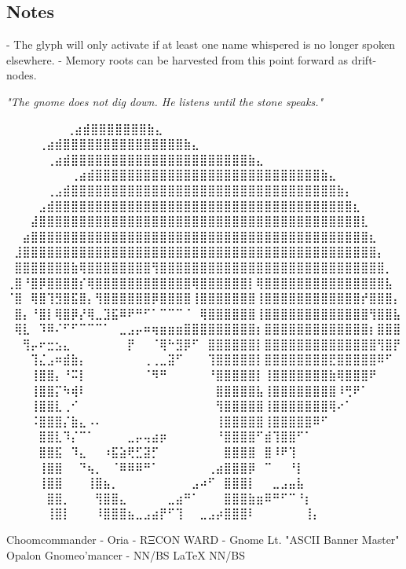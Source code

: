 \subsection*{Notes}
- The glyph will only activate if at least one name whispered is no longer spoken elsewhere.
- Memory roots can be harvested from this point forward as drift-nodes.

\vspace{1cm}
\begin{center}
\textit{"The gnome does not dig down. He listens until the stone speaks."}
\end{center}

\iffalse

  ⠀⠀⠀⠀⠀             ⠀⠀⢀⣴⣾⣿⣿⣿⣿⣿⣿⣿⣷⣄⠀⠀⠀⠀⠀⠀⠀⠀
⠀⠀⠀  ⠀      ⠀⠀⠀⠀⢀⣴⣾⣿⣿⣿⣿⣿⣿⣿⣿⣿⣿⣿⣿⣿⣿⣿⣷⣄⠀⠀⠀⠀⠀⠀⠀⠀
⠀⠀ ⠀   ⠀⠀⠀⠀⠀⢀⣴⣾⣿⣿⣿⣿⣿⣿⣿⣿⣿⣿⣿⣿⣿⣿⣿⣿⣿⣿⣿⣿⣿⣿⣷⣄⠀⠀⠀⠀⠀⠀⠀⠀
⠀⠀⠀⠀⠀⠀⠀⠀⢀⣴⣾⣿⣿⣿⣿⣿⣿⣿⣿⣿⣿⣿⣿⣿⣿⣿⣿⣿⣿⣿⣿⣿⣿⣿⣿⣿⣿⣿⣿⣷⣄⠀⠀⠀⠀⠀⠀⠀⠀
⠀⠀⠀⠀⠀⢀⣠⣾⣿⣿⣿⣿⣿⣿⣿⣿⣿⣿⣿⣿⣿⣿⣿⣿⣿⣿⣿⣿⣿⣿⣿⣿⣿⣿⣿⣿⣿⣿⣿⣿⣿⣷⡄⠀⠀⠀⠀⠀⠀
⠀⠀⠀⠀⣠⣾⣿⣿⣿⣿⣿⣿⣿⣿⣿⣿⣿⣿⣿⣿⣿⣿⣿⣿⣿⣿⣿⣿⣿⣿⣿⣿⣿⣿⣿⣿⣿⣿⣿⣿⣿⣿⣿⣆⠀⠀⠀⠀⠀
⠀⠀⠀⣼⣿⣿⣿⣿⣿⣿⣿⣿⣿⣿⣿⣿⣿⣿⣿⣿⣿⣿⣿⣿⣿⣿⣿⣿⣿⣿⣿⣿⣿⣿⣿⣿⣿⣿⣿⣿⣿⣿⣿⣿⣇⠀⠀⠀⠀
⠀⠀⣴⣿⣿⣿⣿⣿⣿⣿⣿⣿⣿⣿⣿⣿⣿⣿⣿⣿⣿⣿⣿⣿⣿⣿⣿⣿⣿⣿⣿⣿⣿⣿⣿⣿⣿⣿⣿⣿⣿⣿⣿⣿⣿⣆⠀⠀⠀
⠀⣸⣿⣿⣿⣿⣿⣿⣿⣿⣿⣿⣿⣿⣿⣿⣿⣿⣿⣿⣿⣿⣿⣿⣿⣿⣿⣿⣿⣿⣿⣿⣿⣿⣿⣿⣿⣿⣿⣿⣿⣿⣿⣿⣿⣿⡄⠀⠀
⠀⣿⣿⣿⣿⣿⣿⣿⣷⢿⣿⣿⣿⣿⣿⣿⣿⣿⢻⣿⣿⣿⣿⣿⣿⣿⣿⣿⣿⣿⣿⣿⣿⣿⣿⣿⣿⣿⣿⣿⣿⣿⣿⣿⣿⣿⣿⡀⠀
⢀⣿⠘⣿⡿⣿⣿⣿⣿⡎⢿⣿⣿⣿⣿⣿⣿⣿⣿⣿⣿⣿⣿⢿⣿⣿⣿⣿⣿⣿⡇⢿⣿⣿⣿⣿⣿⣿⣿⣿⣿⣿⣿⣿⣿⣿⣿⣧⠀
⠈⣿⠀⢿⣿⢹⣻⣿⣯⣿⡄⢻⣿⣿⣿⣿⣿⣿⡿⣿⣿⣿⣿⢸⣿⣿⣿⣿⣿⣿⣿⢸⣿⣿⣿⣿⣿⣿⣿⣿⣿⣿⣿⣿⡞⣿⣿⣿⡄
⠀⣿⡄⠘⣿⡇⢿⣿⡿⡜⢿⣀⣹⣯⠿⠟⠛⠋⠁⠉⠉⠉⠈⠀⢿⣿⣿⣿⣿⣿⣿⢸⣿⣿⣿⣿⣿⣿⣿⣿⣿⣿⣿⣿⣿⢻⣿⣿⣧
⠀⢿⣇⠀⠹⠿⠌⠋⠋⠉⠉⠉⠁⠀⣀⣠⡤⠶⢶⣶⣶⣶⣿⣿⣿⣿⣿⣿⣿⣿⣿⡆⣿⣿⣿⣿⣿⣿⣿⣿⣿⣿⣿⣿⣿⡆⣿⣿⣿
⠀⠀⢻⡤⠖⣒⣢⣄⠀⠀⠀⠀⠀⠀⠀⡟⠀⠀⠈⢿⠓⣻⡿⠋⠀⣿⣿⣿⣿⣿⣿⡇⣿⣿⣿⣿⣿⣿⣿⣿⣿⣿⣿⣿⣿⣿⢻⣿⡟
⠀⠀⠀⢹⣌⣠⠶⣾⣷⡄⠀⠀⠀⠀⠀⠀⠀⢀⢀⣀⣽⠋⠀⠀⠀⢹⣿⣿⣿⣿⣿⡇⣿⣿⣿⣿⣿⣿⣿⣿⣟⣿⣿⣿⣿⣿⠿⠋⠀
⠀⠀⠀⢸⣿⣿⡄⠘⠭⡇⠀⠀⠀⠀⠀⠀⠀⠈⠻⠛⠀⠀⠀⠀⠀⠘⣿⣿⣿⣿⣿⡇⢸⣿⣿⣿⣿⣿⣿⣿⣷⢿⣿⣿⣿⠟⠀⠀⠀
⠀⠀⠀⢸⣿⣿⡍⠳⢾⠇⠀⠀⠀⠀⠀⠀⠀⠀⠀⠀⠀⠀⠀⠀⠀⠀⣿⣿⣿⣿⣿⣧⢸⣿⣿⣿⣿⣿⣿⣿⣿⠸⢛⠟⠁⠀⠀⠀⠀
⠀⠀⠀⢸⣿⣿⣇⢀⠊⠀⠀⠀⠀⠀⠀⠀⠀⠀⠀⠀⠀⠀⠀⠀⠀⠀⢻⣿⣿⣿⣿⣿⢸⣿⣿⣿⣿⣿⣿⣿⢿⠔⠁⠀⠀⠀⠀⠀⠀
⠀⠀⠀⠨⣿⣿⣿⡌⣷⣄⠠⠄⠀⠀⠀⠀⠀⠀⠀⠀⠀⠀⠀⠀⠀⠀⢸⣿⣿⣿⣿⣿⢸⣿⣿⣿⣿⣿⠿⠋⠀⠀⠀⠀⠀⠀⠀⠀⠀
⠀⠀⠀⠀⣿⣿⣇⠹⡌⠉⠁⠀⠀⠀⠀⣀⡤⢤⣴⡶⠀⠀⠀⠀⠀⠀⠘⣿⣿⣿⣿⠋⣾⢹⣿⣿⠋⠁⠀⠀⠀⠀⠀⠀⠀⠀⠀⠀⠀
⠀⠀⠀⠀⣿⣿⣯⠀⠹⣄⠀⠀⠰⣯⣵⢟⣋⣽⡋⠀⠀⠀⠀⠀⠀⠀⠀⣿⣿⣿⣿⠀⣿⠸⠟⢹⠀⠀⠀⠀⠀⠀⠀⠀⠀⠀⠀⠀⠀
⠀⠀⠀⠀⢸⣿⣿⠀⠀⠙⢦⡀⠀⠈⠿⠿⠿⠛⠁⠀⠀⠀⠀⠀⠀⢀⣴⣿⣿⣿⡿⠀⠉⠀⠀⠘⡇⠀⠀⠀⠀⠀⠀⠀⠀⠀⠀⠀⠀
⠀⠀⠀⠀⢸⣿⣿⠀⠀⠀⢸⣿⣦⡀⠀⠀⠀⠀⠀⠀⠀⠀⠀⣠⠴⠋⠀⣿⣿⣿⡇⠀⠀⣀⣠⣤⣧⠀⠀⠀⠀⠀⠀⠀⠀⠀⠀⠀⠀
⠀⠀⠀⠀⠀⣿⣿⡀⠀⠀⠀⢻⣿⣿⣄⠀⠀⠀⠀⠀⣀⣴⠛⠁⠀⠀⠀⣿⣿⣿⣷⣶⠿⠛⠋⠉⠘⡆⠀⠀⠀⠀⠀⠀⠀⠀⠀⠀⠀
⠀⠀⠀⠀⠀⢸⣿⡇⠀⠀⠀⠸⣿⣿⣿⣦⣀⣠⣴⡟⠋⢹⠀⠀⣀⣠⡴⣿⣿⣿⠇⠀⠀⠀⠀⠀⠀⢸⡄⠀⠀⠀⠀⠀⠀⠀⠀⠀⠀

Choomcommander - Oria - RΞCON WARD - Gnome Lt. "ASCII Banner Master"
             Opalon Gnomeo'mancer - NN/BS LaTeX{} NN/BS

